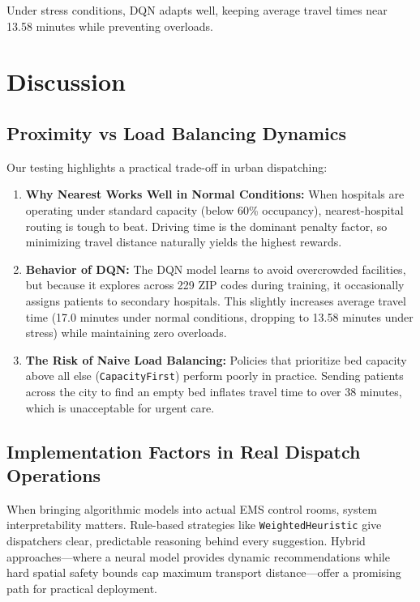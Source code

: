 \documentclass[11pt,a4paper]{article}
\begin{document}
Under stress conditions, DQN adapts well, keeping average travel times near 13.58 minutes while preventing overloads.

\section{Discussion}
\label{sec:discussion}

\subsection{Proximity vs Load Balancing Dynamics}
Our testing highlights a practical trade-off in urban dispatching:
\begin{enumerate}[leftmargin=*]
    \item \textbf{Why Nearest Works Well in Normal Conditions:} When hospitals are operating under standard capacity (below 60\% occupancy), nearest-hospital routing is tough to beat. Driving time is the dominant penalty factor, so minimizing travel distance naturally yields the highest rewards.
    \item \textbf{Behavior of DQN:} The DQN model learns to avoid overcrowded facilities, but because it explores across 229 ZIP codes during training, it occasionally assigns patients to secondary hospitals. This slightly increases average travel time (17.0 minutes under normal conditions, dropping to 13.58 minutes under stress) while maintaining zero overloads.
    \item \textbf{The Risk of Naive Load Balancing:} Policies that prioritize bed capacity above all else (\texttt{CapacityFirst}) perform poorly in practice. Sending patients across the city to find an empty bed inflates travel time to over 38 minutes, which is unacceptable for urgent care.
\end{enumerate}

\subsection{Implementation Factors in Real Dispatch Operations}
When bringing algorithmic models into actual EMS control rooms, system interpretability matters. Rule-based strategies like \texttt{WeightedHeuristic} give dispatchers clear, predictable reasoning behind every suggestion. Hybrid approaches—where a neural model provides dynamic recommendations while hard spatial safety bounds cap maximum transport distance—offer a promising path for practical deployment.
\end{document}
